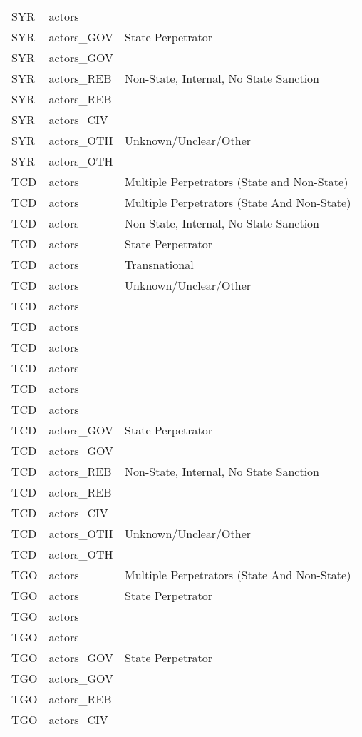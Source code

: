 \begin{table}[ht]
\begin{tabular}{lll}
  SYR & actors &  \\ 
  SYR & actors\_GOV & State Perpetrator \\ 
  SYR & actors\_GOV &  \\ 
  SYR & actors\_REB & Non-State, Internal, No State Sanction \\ 
  SYR & actors\_REB &  \\ 
  SYR & actors\_CIV &  \\ 
  SYR & actors\_OTH & Unknown/Unclear/Other \\ 
  SYR & actors\_OTH &  \\ 
  TCD & actors & Multiple Perpetrators (State and Non-State) \\ 
  TCD & actors & Multiple Perpetrators (State And Non-State) \\ 
  TCD & actors & Non-State, Internal, No State Sanction \\ 
  TCD & actors & State Perpetrator \\ 
  TCD & actors & Transnational \\ 
  TCD & actors & Unknown/Unclear/Other \\ 
  TCD & actors &  \\ 
  TCD & actors &  \\ 
  TCD & actors &  \\ 
  TCD & actors &  \\ 
  TCD & actors &  \\ 
  TCD & actors &  \\ 
  TCD & actors\_GOV & State Perpetrator \\ 
  TCD & actors\_GOV &  \\ 
  TCD & actors\_REB & Non-State, Internal, No State Sanction \\ 
  TCD & actors\_REB &  \\ 
  TCD & actors\_CIV &  \\ 
  TCD & actors\_OTH & Unknown/Unclear/Other \\ 
  TCD & actors\_OTH &  \\ 
  TGO & actors & Multiple Perpetrators (State And Non-State) \\ 
  TGO & actors & State Perpetrator \\ 
  TGO & actors &  \\ 
  TGO & actors &  \\ 
  TGO & actors\_GOV & State Perpetrator \\ 
  TGO & actors\_GOV &  \\ 
  TGO & actors\_REB &  \\ 
  TGO & actors\_CIV &  \\ 

\end{tabular}
\end{table}
